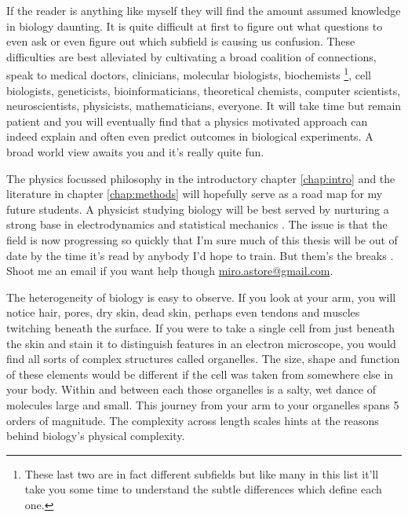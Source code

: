 If the reader is anything like myself they will find the amount assumed knowledge in biology daunting. It is quite difficult at first to figure out what questions to even ask or even figure out which subfield is causing us confusion. These difficulties are best alleviated by cultivating a broad coalition of connections, speak to medical doctors, clinicians, molecular biologists, biochemists \footnote{These last two are in fact different subfields but like many in this list it'll take you some time to understand the subtle differences which define each one.}, cell biologists, geneticists, bioinformaticians, theoretical chemists, computer scientists, neuroscientists, physicists, mathematicians, everyone. It will take time but remain patient and you will eventually find that a physics motivated approach can indeed explain and often even predict outcomes in biological experiments. A broad world view awaits you and it's really quite fun. 

The physics focussed philosophy in the introductory chapter \ref{chap:intro} and the literature in chapter \ref{chap:methods} will hopefully serve as a road map for my future students. A physicist studying biology will be best served by nurturing a strong base in electrodynamics and statistical mechanics \cite{griffiths2017, reif2009, zuckerman2010}. The issue is that the field is now progressing so quickly that I'm sure much of this thesis will be out of date by the time it's read by anybody I'd hope to train. But them's the breaks \cite{reuters2022}. Shoot me an email if you want help though \href{mailto:miro.astore@gmailcom}{miro.astore@gmail.com}.

The heterogeneity of biology is easy to observe. If you look at your arm, you will notice hair, pores, dry skin, dead skin, perhaps even tendons and muscles twitching beneath the surface. If you were to take a single cell from just beneath the skin and stain it to distinguish features in an electron microscope, you would find all sorts of complex structures called organelles. The size, shape and function of these elements would be different if the cell was taken from somewhere else in your body. Within and between each those organelles is a salty, wet dance of molecules large and small. This journey from your arm to your organelles spans 5 orders of magnitude. The complexity across length scales hints at the reasons behind biology's physical complexity. 


